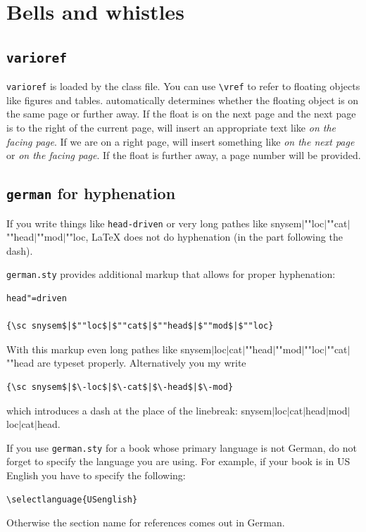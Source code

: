 \section{Bells and whistles}

\subsection{\texttt{varioref}}

\texttt{varioref} is loaded by the \lsp class file. You can use \verb+\vref+ to refer to floating
objects like figures and tables. \latex automatically determines whether the floating object is on
the same page or further away. If the float is on the next page and the next page is to the right of
the current page, \latex will insert an appropriate text like \emph{on the facing page}. If we are
on a right page, \latex will insert something like \emph{on the next page} or \emph{on the facing page}. If the float is further
away, a page number will be provided.



\subsection{\texttt{german} for hyphenation}

If you write things like \verb+head-driven+ or very long pathes like
{\sc snysem$|$""loc$|$""cat$|$""head$|$""mod$|$""loc}, \LaTeX{} does not do hyphenation
(in the part following the dash).

\verb+german.sty+ provides additional markup that allows for proper hyphenation:
\begin{verbatim}
head"=driven

{\sc snysem$|$""loc$|$""cat$|$""head$|$""mod$|$""loc}
\end{verbatim}
With this markup even long pathes like {\sc snysem$|$loc$|$cat$|$""head$|$""mod$|$""loc$|$""cat$|$""head}
are typeset properly. Alternatively you my write
\begin{verbatim}
{\sc snysem$|$\-loc$|$\-cat$|$\-head$|$\-mod}
\end{verbatim}
which introduces a dash at the place of the linebreak:
{\sc snysem$|$\-loc$|$\-cat$|$\-head$|$\-mod$|$\-loc$|$\-cat$|$\-head}.

If you use \verb+german.sty+ for a book whose primary language is not German, do not forget to
specify the language you are using. For example, if your book is in US English you have to specify
the following:
\begin{verbatim}
\selectlanguage{USenglish}
\end{verbatim}
Otherwise the section name for references comes out in German.

